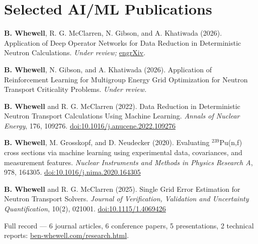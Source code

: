 \documentclass[10.5pt,letterpaper]{article}
\begin{document}
\section{Selected AI/ML Publications}
\begin{tight}
  \item \textbf{B. Whewell}, R. G. McClarren, N. Gibson, and A. Khatiwada (2026). Application of Deep
    Operator Networks for Data Reduction in Deterministic Neutron Calculations. \textit{Under review;}
    \href{https://doi.org/10.31224/8581}{engrXiv}.
  \item \textbf{B. Whewell}, N. Gibson, and A. Khatiwada (2026). Application of Reinforcement Learning for
    Multigroup Energy Grid Optimization for Neutron Transport Criticality Problems. \textit{Under review.}
  \item \textbf{B. Whewell} and R. G. McClarren (2022). Data Reduction in Deterministic Neutron Transport
    Calculations Using Machine Learning. \textit{Annals of Nuclear Energy}, 176, 109276.
    \href{https://doi.org/10.1016/j.anucene.2022.109276}{doi:10.1016/j.anucene.2022.109276}
  \item \textbf{B. Whewell}, M. Grosskopf, and D. Neudecker (2020). Evaluating $^{239}$Pu(n,f) cross sections
    via machine learning using experimental data, covariances, and measurement features.
    \textit{Nuclear Instruments and Methods in Physics Research A}, 978, 164305.
    \href{https://doi.org/10.1016/j.nima.2020.164305}{doi:10.1016/j.nima.2020.164305}
  \item \textbf{B. Whewell} and R. G. McClarren (2025). Single Grid Error Estimation for Neutron Transport
    Solvers. \textit{Journal of Verification, Validation and Uncertainty Quantification}, 10(2), 021001.
    \href{https://doi.org/10.1115/1.4069426}{doi:10.1115/1.4069426}
\end{tight}
\vspace{2pt}
{\small Full record --- 6 journal articles, 6 conference papers, 5 presentations, 2 technical reports:
\href{https://www.ben-whewell.com/research.html}{ben-whewell.com/research.html}.}

\end{document}
